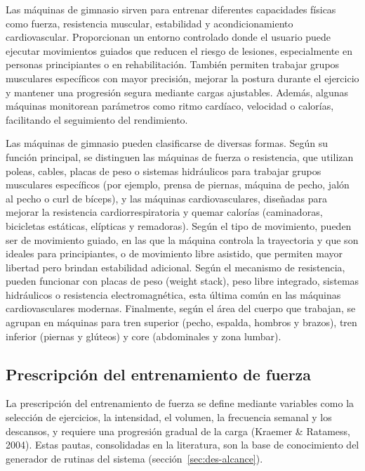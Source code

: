 Las máquinas de gimnasio sirven para entrenar diferentes capacidades físicas
como fuerza, resistencia muscular, estabilidad y acondicionamiento
cardiovascular. Proporcionan un entorno controlado donde el usuario puede
ejecutar movimientos guiados que reducen el riesgo de lesiones, especialmente
en personas principiantes o en rehabilitación. También permiten trabajar grupos
musculares específicos con mayor precisión, mejorar la postura durante el
ejercicio y mantener una progresión segura mediante cargas ajustables. Además,
algunas máquinas monitorean parámetros como ritmo cardíaco, velocidad o
calorías, facilitando el seguimiento del rendimiento.

Las máquinas de gimnasio pueden clasificarse de diversas formas. Según su
función principal, se distinguen las máquinas de fuerza o resistencia, que
utilizan poleas, cables, placas de peso o sistemas hidráulicos para trabajar
grupos musculares específicos (por ejemplo, prensa de piernas, máquina de pecho,
jalón al pecho o curl de bíceps), y las máquinas cardiovasculares, diseñadas
para mejorar la resistencia cardiorrespiratoria y quemar calorías (caminadoras,
bicicletas estáticas, elípticas y remadoras). Según el tipo de movimiento,
pueden ser de movimiento guiado, en las que la máquina controla la trayectoria
y que son ideales para principiantes, o de movimiento libre asistido, que
permiten mayor libertad pero brindan estabilidad adicional. Según el mecanismo
de resistencia, pueden funcionar con placas de peso (weight stack), peso libre
integrado, sistemas hidráulicos o resistencia electromagnética, esta última
común en las máquinas cardiovasculares modernas. Finalmente, según el área del
cuerpo que trabajan, se agrupan en máquinas para tren superior (pecho, espalda,
hombros y brazos), tren inferior (piernas y glúteos) y core (abdominales y zona
lumbar).

\subsection{Prescripción del entrenamiento de fuerza}
\label{subsec:prescripcion}

La prescripción del entrenamiento de fuerza se define mediante variables como la
selección de ejercicios, la intensidad, el volumen, la frecuencia semanal y los
descansos, y requiere una progresión gradual de la carga (Kraemer \&
Ratamess, 2004). Estas pautas, consolidadas en la literatura, son la base de
conocimiento del generador de rutinas del sistema
(sección~\ref{sec:des-alcance}).

